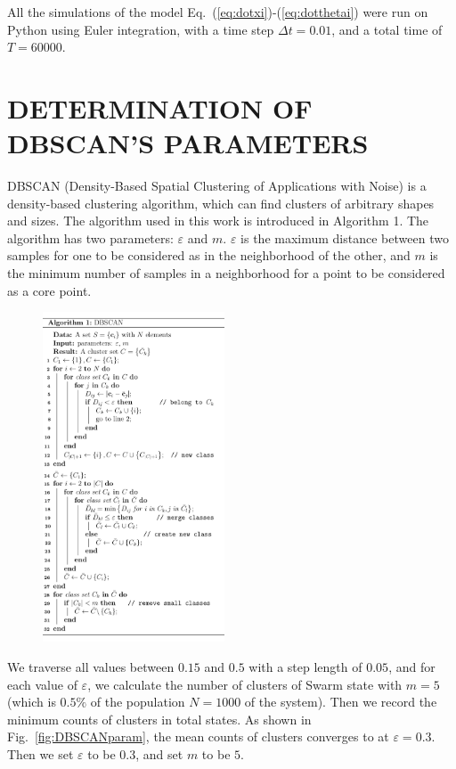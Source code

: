 \documentclass[%
 aip,
 amsmath,amssymb,
 reprint,%
]{revtex4-1}
\begin{document}
All the simulations of the model Eq.~(\ref{eq:dotxi})-(\ref{eq:dotthetai}) were run on Python using Euler integration, with a time step $\Delta t=0.01$, and a total time of $T=60000$. 


\section{\label{sec:DBSCAN_param} DETERMINATION OF DBSCAN'S PARAMETERS}

DBSCAN (Density-Based Spatial Clustering of Applications with Noise) is a density-based clustering algorithm, which can find clusters of arbitrary shapes and sizes. The algorithm used in this work is introduced in Algorithm 1.
The algorithm has two parameters: $\varepsilon$ and $m$. $\varepsilon$ is the maximum distance between two samples for one to be considered as in the neighborhood of the other, and $m$ is the minimum number of samples in a neighborhood for a point to be considered as a core point. 

\begin{figure}
    \includegraphics[width=0.48\textwidth]{./algorithm/algo.pdf}\label{algo:DBSCAN}
\end{figure}

We traverse all values between $0.15$ and $0.5$ with a step length of $0.05$, and for each value of $\varepsilon$, we calculate the number of clusters of Swarm state with $m=5$ (which is $0.5\%$ of the population $N=1000$ of the system). Then we record the minimum counts of clusters in total states. 
As shown in Fig.~\ref{fig:DBSCANparam}, the mean counts of clusters converges to at $\varepsilon=0.3$. Then we set $\varepsilon$ to be $0.3$, and set $m$ to be $5$.
\end{document}
